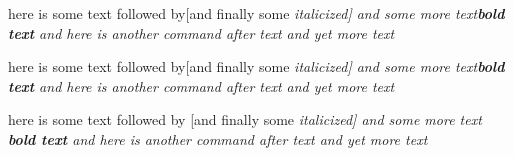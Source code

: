 here is some text followed by[and finally some \itshape{italicized}] and
some more text\textbf{bold text} and here is another command after text  and yet more text

here is some text followed by[and finally some \itshape{italicized}] and
some more text\textbf{bold text} and here is another command  after text  and yet more text

here is some text followed by [and finally some \itshape{italicized}] and
some more text \textbf{bold text} and here is another command after text and yet more text
